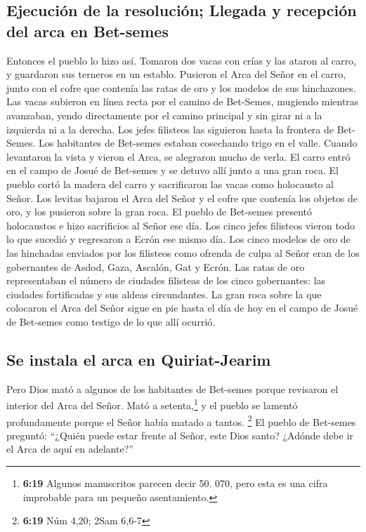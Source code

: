 \hypertarget{ejecuciuxf3n-de-la-resoluciuxf3n-llegada-y-recepciuxf3n-del-arca-en-bet-semes}{%
\subsection{Ejecución de la resolución; Llegada y recepción del arca en
Bet-semes}\label{ejecuciuxf3n-de-la-resoluciuxf3n-llegada-y-recepciuxf3n-del-arca-en-bet-semes}}

 Entonces el pueblo lo hizo así. Tomaron dos vacas con
crías y las ataron al carro, y guardaron sus terneros en un establo.
 Pusieron el Arca del Señor en el carro, junto con el
cofre que contenía las ratas de oro y los modelos de sus hinchazones.
 Las vacas subieron en línea recta por el camino de
Bet-Semes, mugiendo mientras avanzaban, yendo directamente por el camino
principal y sin girar ni a la izquierda ni a la derecha. Los jefes
filisteos las siguieron hasta la frontera de Bet-Semes. 
Los habitantes de Bet-semes estaban cosechando trigo en el valle. Cuando
levantaron la vista y vieron el Arca, se alegraron mucho de verla.
 El carro entró en el campo de Josué de Bet-semes y se
detuvo allí junto a una gran roca. El pueblo cortó la madera del carro y
sacrificaron las vacas como holocausto al Señor.  Los
levitas bajaron el Arca del Señor y el cofre que contenía los objetos de
oro, y los pusieron sobre la gran roca. El pueblo de Bet-semes presentó
holocaustos e hizo sacrificios al Señor ese día.  Los
cinco jefes filisteos vieron todo lo que sucedió y regresaron a Ecrón
ese mismo día.  Los cinco modelos de oro de las hinchadas
enviados por los filisteos como ofrenda de culpa al Señor eran de los
gobernantes de Asdod, Gaza, Ascalón, Gat y Ecrón.  Las
ratas de oro representaban el número de ciudades filisteas de los cinco
gobernantes: las ciudades fortificadas y sus aldeas circundantes. La
gran roca sobre la que colocaron el Arca del Señor sigue en pie hasta el
día de hoy en el campo de Josué de Bet-semes como testigo de lo que allí
ocurrió.

\hypertarget{se-instala-el-arca-en-quiriat-jearim}{%
\subsection{Se instala el arca en
Quiriat-Jearim}\label{se-instala-el-arca-en-quiriat-jearim}}

 Pero Dios mató a algunos de los habitantes de Bet-semes
porque revisaron el interior del Arca del Señor. Mató a
setenta,\footnote{\textbf{6:19} Algunos manuscritos parecen decir 50.
  070, pero esta es una cifra improbable para un pequeño asentamiento.}
y el pueblo se lamentó profundamente porque el Señor había matado a
tantos. \footnote{\textbf{6:19} Núm 4,20; 2Sam 6,6-7}  El
pueblo de Bet-semes preguntó: ``¿Quién puede estar frente al Señor, este
Dios santo? ¿Adónde debe ir el Arca de aquí en adelante?''

